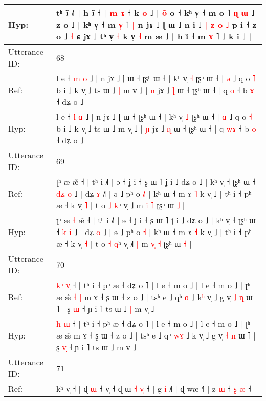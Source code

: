 \documentclass[10pt]{article}
\DeclareRobustCommand{\hl}[1]{{\textcolor{red}{#1}}}
\begin{document}
\begin{longtable}{ll}
 \\
Hyp: & tʰ i\hl{̃} ˩˥ | h ĩ ˧\hl{}\hl{}\hl{}\hl{}\hl{}\hl{}\hl{}\hl{}\hl{}\hl{}\hl{}\hl{}\hl{} | \hl{m} \hl{ɤ} ˧ k \hl{}\hl{o} ˩ | \hl{o}\hl{̃} o ˧\hl{}\hl{} kʰ v̩ ˧ m o ˥ \hl{ɳ} \hl{ɯ} ˩ z o ˩ | kʰ v̩ ˧ m \hl{v}\hl{̩} ˥\hl{ }\hl{|} n jɤ ˩ ɭ ɯ ˩ n i ˩ \hl{|} \hl{z} \hl{o} \hl{˩} p i ˧ z o ˩ \hl{˧} ɕ jɤ ˩ tʰ v̩ \hl{˧} k v̩ \hl{˧} m æ ˩ | h ĩ ˧ m \hl{ɤ} ˥\hl{}\hl{}\hl{}\hl{} ˩ k i ˩ |
 \\
\midrule
Utterance ID: & 68 \\
Ref: & l e ˧ \hl{m} \hl{o} ˩ | n jɤ ˩ ɭ ɯ ˧ ʈʂʰ ɯ ˧ | kʰ v̩ \hl{˧} ʈʂʰ ɯ ˧ | \hl{ə} ˩ q o \hl{˥} b i ˩ k v̩ ˩ ts ɯ ˩\hl{ }\hl{|} m v̩ ˩ | \hl{n} jɤ ˩ \hl{ɭ} ɯ ˧ ʈʂʰ ɯ ˧ | q \hl{}\hl{o} ˧ b \hl{ɤ} ˧ dʑ o ˩ |
 \\
Hyp: & l e ˧ \hl{l} \hl{ɑ} ˩ | n jɤ ˩ ɭ ɯ ˧ ʈʂʰ ɯ ˧ | kʰ v̩ \hl{˩} ʈʂʰ ɯ ˧ | \hl{ɑ} ˩ q o \hl{˧} b i ˩ k v̩ ˩ ts ɯ ˩\hl{}\hl{} m v̩ ˩ | \hl{ɲ} jɤ ˩ \hl{ɳ} ɯ ˧ ʈʂʰ ɯ ˧ | q \hl{w}\hl{ɤ} ˧ b \hl{o} ˧ dʑ o ˩ |
 \\
\midrule
Utterance ID: & 69 \\
Ref: & ʈʰ æ\hl{}\hl{} æ̃ ˧ | tʰ i ˩˥ | ə ˧ ʝ i ˧ ʂ ɯ ˥ ʝ i ˩ dʑ o ˩ | kʰ v̩ ˧ ʈʂʰ ɯ ˧ \hl{d}\hl{ʑ} \hl{o} ˩ | dʑ \hl{ɤ} ˩\hl{˥} | ə ˩ pʰ o \hl{˩}\hl{˥} | kʰ ɯ ˧ m ɤ \hl{˥} k v̩ ˩ | tʰ i ˧ pʰ æ ˧ k v̩ \hl{˥} | t o \hl{˩} \hl{k}ʰ v̩ ˩\hl{}\hl{}\hl{} m \hl{}\hl{i} \hl{˥} ʈʂʰ ɯ \hl{˩} |
 \\
Hyp: & ʈʰ æ\hl{ }\hl{˧} æ̃ ˧ | tʰ i ˩˥ | ə ˧ ʝ i ˧ ʂ ɯ ˥ ʝ i ˩ dʑ o ˩ | kʰ v̩ ˧ ʈʂʰ ɯ ˧ \hl{}\hl{k} \hl{i} ˩ | dʑ \hl{o} ˩\hl{} | ə ˩ pʰ o \hl{}\hl{˧} | kʰ ɯ ˧ m ɤ \hl{˧} k v̩ ˩ | tʰ i ˧ pʰ æ ˧ k v̩ \hl{˧} | t o \hl{˧} \hl{q}ʰ v̩ ˩\hl{˥}\hl{ }\hl{|} m \hl{v}\hl{̩} \hl{˧} ʈʂʰ ɯ \hl{˧} |
 \\
\midrule
Utterance ID: & 70 \\
Ref: & \hl{k}\hl{ʰ} \hl{v}\hl{̩} ˧ | tʰ i ˧ pʰ æ ˧ dʑ o ˥ | l e ˧ m o ˩ | l e ˧ m o ˩ | ʈʰ æ æ̃\hl{ }\hl{˧}\hl{ }\hl{|} m ɤ ˧ ʂ ɯ ˧ z o ˩ | tsʰ e ˩ qʰ \hl{}\hl{ɑ} ˩ k\hl{ʰ} v̩ ˩ g v̩ \hl{˩} \hl{ɳ} ɯ ˥ | ʂ \hl{}\hl{ɯ} ˧ ɲ i ˥ ts ɯ ˩\hl{ }\hl{|} m v̩ ˩\hl{}\hl{}
 \\
Hyp: & \hl{}\hl{h} \hl{}\hl{ɯ} ˧ | tʰ i ˧ pʰ æ ˧ dʑ o ˥ | l e ˧ m o ˩ | l e ˧ m o ˩ | ʈʰ æ æ̃\hl{}\hl{}\hl{}\hl{} m ɤ ˧ ʂ ɯ ˧ z o ˩ | tsʰ e ˩ qʰ \hl{w}\hl{ɤ} ˩ k\hl{} v̩ ˩ g v̩ \hl{˧} \hl{n} ɯ ˥ | ʂ \hl{v}\hl{̩} ˧ ɲ i ˥ ts ɯ ˩\hl{}\hl{} m v̩ ˩\hl{ }\hl{|}
 \\
\midrule
Utterance ID: & 71 \\
Ref: & kʰ v̩ ˧ | ɖ \hl{}\hl{ɯ} ˧ v̩ ˧ ɖ ɯ\hl{ }\hl{˧}\hl{ }\hl{v}\hl{̩} ˧ | g \hl{i} ˩˥ | ɖ wæ ˧˥ | z \hl{ɯ} ˧ \hl{ʂ} \hl{æ} ˧ |

\end{longtable}
\end{document}
